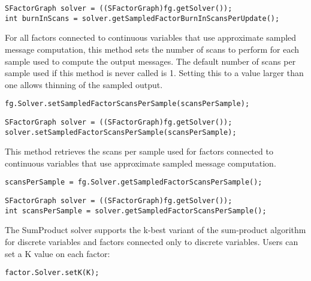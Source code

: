 \ifjava
\begin{lstlisting}
SFactorGraph solver = ((SFactorGraph)fg.getSolver());
int burnInScans = solver.getSampledFactorBurnInScansPerUpdate();
\end{lstlisting}
\fi



For all factors connected to continuous variables that use approximate sampled message computation, this method sets the number of scans to perform for each sample used to compute the output messages.  The default number of scans per sample used if this method is never called is 1.  Setting this to a value larger than one allows thinning of the sampled output.

\ifmatlab
\begin{lstlisting}
fg.Solver.setSampledFactorScansPerSample(scansPerSample);
\end{lstlisting}
\fi

\ifjava
\begin{lstlisting}
SFactorGraph solver = ((SFactorGraph)fg.getSolver());
solver.setSampledFactorScansPerSample(scansPerSample);
\end{lstlisting}
\fi


This method retrieves the scans per sample used for factors connected to continuous variables that use approximate sampled message computation.

\ifmatlab
\begin{lstlisting}
scansPerSample = fg.Solver.getSampledFactorScansPerSample();
\end{lstlisting}
\fi

\ifjava
\begin{lstlisting}
SFactorGraph solver = ((SFactorGraph)fg.getSolver());
int scansPerSample = solver.getSampledFactorScansPerSample();
\end{lstlisting}
\fi




The SumProduct solver supports the k-best variant of the sum-product algorithm for discrete variables and factors connected only to discrete variables.  Users can set a K value on each factor:

\ifmatlab
\begin{lstlisting}
factor.Solver.setK(K);
\end{lstlisting}
\fi

